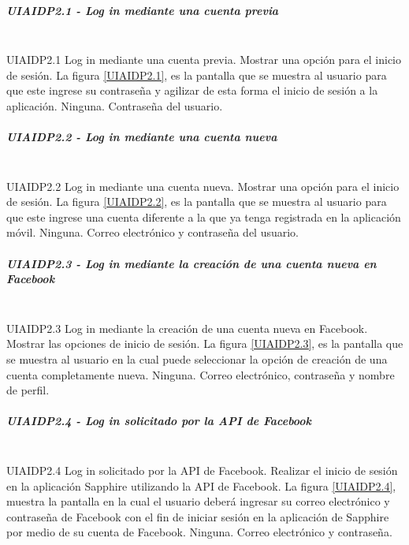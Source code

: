 \subparagraph{UIAIDP2.1 - Log in mediante una cuenta previa} ~\\
\FloatBarrier
{} %
{UIAIDP2.1} %
{Log in mediante una cuenta previa.}  %
{Mostrar una opción para el inicio de sesión.} %
{La figura \ref{UIAIDP2.1}, es la pantalla que se muestra al usuario para que este ingrese su contraseña y agilizar de esta forma el inicio de sesión a la aplicación.} %
{Ninguna.} %
{Contraseña del usuario.} %
\FloatBarrier

\subparagraph{UIAIDP2.2 - Log in mediante una cuenta nueva} ~\\
\FloatBarrier
{} %
{UIAIDP2.2} %
{Log in mediante una cuenta nueva.}  %
{Mostrar una opción para el inicio de sesión.} %
{La figura \ref{UIAIDP2.2}, es la pantalla que se muestra al usuario para que este ingrese una cuenta diferente a la que ya tenga registrada en la aplicación móvil.} %
{Ninguna.} %
{Correo electrónico y contraseña del usuario.} %
\FloatBarrier

\subparagraph{UIAIDP2.3 - Log in mediante la creación de una cuenta nueva en Facebook} ~\\
\FloatBarrier
{} %
{UIAIDP2.3} %
{Log in mediante la creación de una cuenta nueva en Facebook.}  %
{Mostrar las opciones de inicio de sesión.} %
{La figura \ref{UIAIDP2.3}, es la pantalla que se muestra al usuario en la cual puede seleccionar la opción de creación de una cuenta completamente nueva.} %
{Ninguna.} %
{Correo electrónico, contraseña y nombre de perfil.} %
\FloatBarrier

\subparagraph{UIAIDP2.4 - Log in solicitado por la API de Facebook} ~\\
\FloatBarrier
{} %
{UIAIDP2.4} %
{Log in solicitado por la API de Facebook.}  %
{Realizar el inicio de sesión en la aplicación Sapphire utilizando la API de Facebook.} %
{La figura \ref{UIAIDP2.4}, muestra la pantalla en la cual el usuario deberá ingresar su correo electrónico y contraseña de Facebook con el fin de iniciar sesión en la aplicación de Sapphire por medio de su cuenta de Facebook.} %
{Ninguna.} %
{Correo electrónico y contraseña.} %
\FloatBarrier

